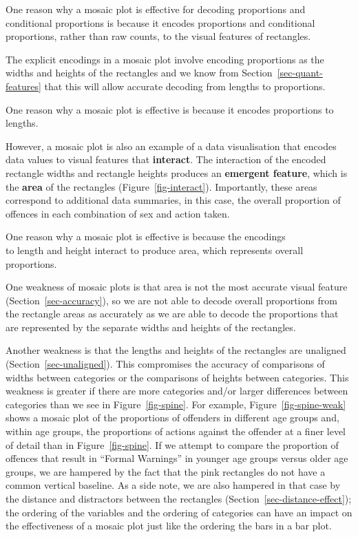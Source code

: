 \documentclass[
  letterpaper,
  DIV=11,
  numbers=noendperiod]{scrreprt}
\begin{document}
One reason why a mosaic plot is effective for decoding proportions and
conditional proportions is because it encodes proportions and
conditional proportions, rather than raw counts, to the visual features
of rectangles.

The explicit encodings in a mosaic plot involve encoding proportions as
the widths and heights of the rectangles and we know from
Section~\ref{sec-quant-features} that this will allow accurate decoding
from lengths to proportions.

One reason why a mosaic plot is effective is because it encodes
proportions to lengths.

However, a mosaic plot is also an example of a data visualisation that
encodes data values to visual features that \textbf{interact}. The
interaction of the encoded rectangle widths and rectangle heights
produces an \textbf{emergent feature}, which is the \textbf{area} of the
rectangles (Figure~\ref{fig-interact}). Importantly, these areas
correspond to additional data summaries, in this case, the overall
proportion of offences in each combination of sex and action taken.

One reason why a mosaic plot is effective is because the encodings\\
to length and height interact to produce area, which represents overall
proportions.

One weakness of mosaic plots is that area is not the most accurate
visual feature (Section~\ref{sec-accuracy}), so we are not able to
decode overall proportions from the rectangle areas as accurately as we
are able to decode the proportions that are represented by the separate
widths and heights of the rectangles.

Another weakness is that the lengths and heights of the rectangles are
unaligned (Section~\ref{sec-unaligned}). This compromises the accuracy
of comparisons of widths between categories or the comparisons of
heights between categories. This weakness is greater if there are more
categories and/or larger differences between categories than we see in
Figure~\ref{fig-spine}. For example, Figure~\ref{fig-spine-weak} shows a
mosaic plot of the proportions of offenders in different age groups and,
within age groups, the proportions of actions against the offender at a
finer level of detail than in Figure~\ref{fig-spine}. If we attempt to
compare the proportion of offences that result in ``Formal Warnings'' in
younger age groups versus older age groups, we are hampered by the fact
that the pink rectangles do not have a common vertical baseline. As a
side note, we are also hampered in that case by the distance and
distractors between the rectangles (Section~\ref{sec-distance-effect});
the ordering of the variables and the ordering of categories can have an
impact on the effectiveness of a mosaic plot just like the ordering the
bars in a bar plot.
\end{document}

